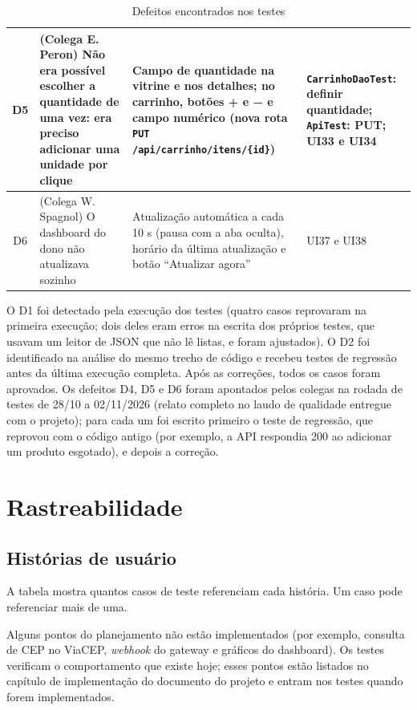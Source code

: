 \documentclass[12pt]{article}
\begin{document}
\begin{table}[H]
\begin{tabular}{|c|p{4.0cm}|p{3.5cm}|p{3.5cm}|}
D5 & (Colega E. Peron) Não era possível escolher a quantidade de uma vez: era preciso adicionar uma unidade por clique & Campo de quantidade na vitrine e nos detalhes; no carrinho, botões + e − e campo numérico (nova rota \texttt{PUT /api/carrinho/itens/\{id\}}) & \texttt{Carrinho\-Dao\-Test}: definir quantidade; \texttt{Api\-Test}: PUT; UI33 e UI34 \\ \hline
D6 & (Colega W. Spagnol) O dashboard do dono não atualizava sozinho & Atualização automática a cada 10 s (pausa com a aba oculta), horário da última atualização e botão ``Atualizar agora'' & UI37 e UI38 \\ \hline
\end{tabular}
\caption{Defeitos encontrados nos testes}
\end{table}

O D1 foi detectado pela execução dos testes (quatro casos reprovaram na primeira execução; dois deles eram erros na escrita dos próprios testes, que usavam um leitor de JSON que não lê listas, e foram ajustados). O D2 foi identificado na análise do mesmo trecho de código e recebeu testes de regressão antes da última execução completa. Após as correções, todos os casos foram aprovados. Os defeitos D4, D5 e D6 foram apontados pelos colegas na rodada de testes de 28/10 a 02/11/2026 (relato completo no laudo de qualidade entregue com o projeto); para cada um foi escrito primeiro o teste de regressão, que reprovou com o código antigo (por exemplo, a API respondia 200 ao adicionar um produto esgotado), e depois a correção.

\section{Rastreabilidade}

\subsection{Histórias de usuário}

A tabela mostra quantos casos de teste referenciam cada história. Um caso pode referenciar mais de uma.



\begin{dica}
Alguns pontos do planejamento não estão implementados (por exemplo, consulta de CEP no ViaCEP, \textit{webhook} do gateway e gráficos do dashboard). Os testes verificam o comportamento que existe hoje; esses pontos estão listados no capítulo de implementação do documento do projeto e entram nos testes quando forem implementados.
\end{dica}
\end{document}
